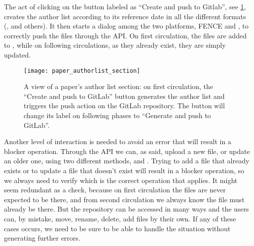 The act of clicking on the button labeled as \enquote{Create and push to Gitlab}, see \cref{fig:paper_authorlist_section}, creates the author list according to its reference date in all the different formats (,  and others).
It then starts a dialog among the two platforms, FENCE and \gitlab, to correctly push the files through the \gitlab API.
On first circulation, the files are added to \gitlab, while on following circulations, as they already exist, they are simply updated.

\begin{figure}[htb]
  \centering
  \texttt{[image: paper\_authorlist\_section]}
  \caption{A view of a paper's author list section: on first circulation,
  the \enquote{Create and push to GitLab} button generates the author list and triggers the push action on the GitLab repository.
  The button will change its label on following phases to \enquote{Generate and push to GitLab}.}%
  \label{fig:paper_authorlist_section}
\end{figure}

Another level of interaction is needed to avoid an error that will result in a blocker operation.
Through the \gitlab API we can, as said, upload a new file, or update an older one, using two different methods,  and .
Trying to add a file that already exists or to update a file that doesn't exist will result in a blocker operation, so we always need to verify which is the correct operation that applies.
It might seem redundant as a check, because on first circulation the files are never expected to be there, and from second circulation we always know the file must already be there. But the repository can be accessed in many ways and the users can, by mistake, move, rename, delete, add files by their own. If any of these cases occurs, we need to be sure to be able to handle the situation without generating further errors.
